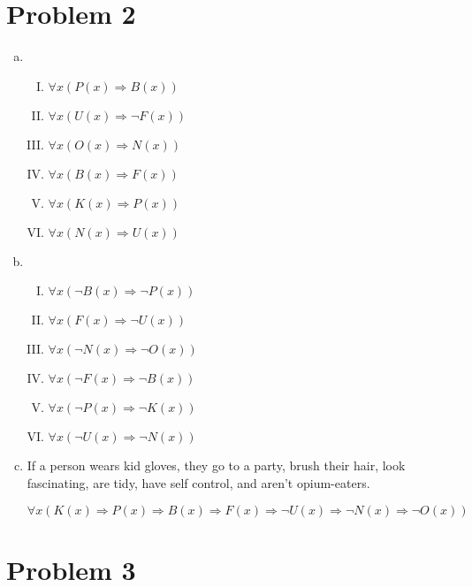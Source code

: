 \documentclass[11pt,letterpaper]{article}
\begin{document}
\newpage

\section*{Problem 2}

\begin{enumerate}[(a)]
\item
\begin{enumerate}[(I)]
\item
$\forall x (P(x)\Rightarrow B(x))$
\item
$\forall x (U(x)\Rightarrow \neg F(x))$
\item
$\forall x (O(x)\Rightarrow N(x))$
\item
$\forall x (B(x)\Rightarrow F(x))$
\item
$\forall x (K(x)\Rightarrow P(x))$
\item
$\forall x (N(x)\Rightarrow U(x))$
\end{enumerate}

\item
\begin{enumerate}[(I)]
\item
$\forall x (\neg B(x)\Rightarrow \neg P(x))$
\item
$\forall x (F(x)\Rightarrow \neg U(x))$
\item
$\forall x (\neg N(x)\Rightarrow \neg O(x))$
\item
$\forall x (\neg F(x)\Rightarrow \neg B(x))$
\item
$\forall x (\neg P(x)\Rightarrow \neg K(x))$
\item
$\forall x (\neg U(x)\Rightarrow \neg N(x))$
\end{enumerate}

\item
If a person wears kid gloves, they go to a party, brush their hair, look fascinating, are tidy, have self control, and aren't opium-eaters.

$\forall x (K(x)\Rightarrow P(x)\Rightarrow B(x)\Rightarrow F(x)\Rightarrow \neg U(x)\Rightarrow \neg N(x)\Rightarrow \neg O(x))$


\end{enumerate}

\clearpage
\section*{Problem 3}
\end{document}
